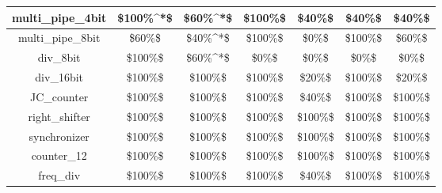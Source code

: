 \begin{tabular}{c|cc|cc|cc}
multi\_pipe\_4bit & \color{black} {\cellcolor{lightblue}} \$100\%^*\$ & \color{black} {\cellcolor{lightgreen}} \$60\%^*\$ & \color{black} {\cellcolor{lightblue}} \$100\%\$ & \$40\%\$ & \$40\%\$ & \$40\%\$ \\ \midrule
multi\_pipe\_8bit & \$60\%\$ & \$40\%^*\$ & \color{black} {\cellcolor{lightblue}} \$100\%\$ & \$0\%\$ & \color{black} {\cellcolor{lightblue}} \$100\%\$ & \color{black} {\cellcolor{lightgreen}} \$60\%\$ \\ \midrule
div\_8bit & \color{black} {\cellcolor{lightblue}} \$100\%\$ & \color{black} {\cellcolor{lightgreen}} \$60\%^*\$ & \$0\%\$ & \$0\%\$ & \$0\%\$ & \$0\%\$ \\ \midrule
div\_16bit & \color{black} {\cellcolor{lightblue}} \$100\%\$ & \color{black} {\cellcolor{lightgreen}} \$100\%\$ & \color{black} {\cellcolor{lightblue}} \$100\%\$ & \$20\%\$ & \color{black} {\cellcolor{lightblue}} \$100\%\$ & \$20\%\$ \\ \midrule
JC\_counter & \color{black} {\cellcolor{lightblue}} \$100\%\$ & \color{black} {\cellcolor{lightgreen}} \$100\%\$ & \color{black} {\cellcolor{lightblue}} \$100\%\$ & \$40\%\$ & \color{black} {\cellcolor{lightblue}} \$100\%\$ & \color{black} {\cellcolor{lightgreen}} \$100\%\$ \\ \midrule
right\_shifter & \color{black} {\cellcolor{lightblue}} \$100\%\$ & \color{black} {\cellcolor{lightgreen}} \$100\%\$ & \color{black} {\cellcolor{lightblue}} \$100\%\$ & \color{black} {\cellcolor{lightgreen}} \$100\%\$ & \color{black} {\cellcolor{lightblue}} \$100\%\$ & \color{black} {\cellcolor{lightgreen}} \$100\%\$ \\ \midrule
synchronizer & \color{black} {\cellcolor{lightblue}} \$100\%\$ & \color{black} {\cellcolor{lightgreen}} \$100\%\$ & \color{black} {\cellcolor{lightblue}} \$100\%\$ & \color{black} {\cellcolor{lightgreen}} \$100\%\$ & \color{black} {\cellcolor{lightblue}} \$100\%\$ & \color{black} {\cellcolor{lightgreen}} \$100\%\$ \\ \midrule
counter\_12 & \color{black} {\cellcolor{lightblue}} \$100\%\$ & \color{black} {\cellcolor{lightgreen}} \$100\%\$ & \color{black} {\cellcolor{lightblue}} \$100\%\$ & \color{black} {\cellcolor{lightgreen}} \$100\%\$ & \color{black} {\cellcolor{lightblue}} \$100\%\$ & \color{black} {\cellcolor{lightgreen}} \$100\%\$ \\ \midrule
freq\_div & \color{black} {\cellcolor{lightblue}} \$100\%\$ & \color{black} {\cellcolor{lightgreen}} \$100\%\$ & \color{black} {\cellcolor{lightblue}} \$100\%\$ & \$40\%\$ & \color{black} {\cellcolor{lightblue}} \$100\%\$ & \color{black} {\cellcolor{lightgreen}} \$100\%\$ \\ \midrule

\end{tabular}
